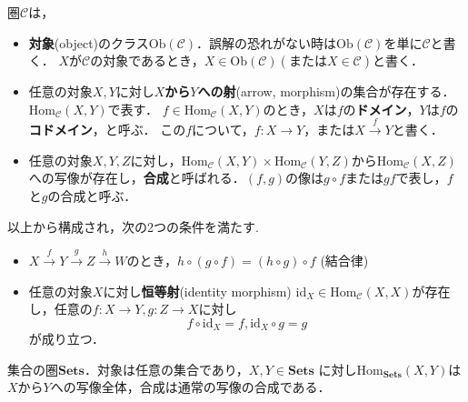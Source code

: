 
\begin{defi}
圏$\mathcal{C}$は，
\begin{itemize}

\item 
{\bf 対象}(object)のクラス$\mathrm{Ob}(\mathcal{C})$．誤解の恐れがない時は$\mathrm{Ob}(\mathcal{C})$を単に$\mathcal{C}$と書く．
$X$が$\mathcal{C}$の対象であるとき，$X \in \mathrm{Ob}(\mathcal{C}) (または X \in \mathcal{C})$と書く．

\item 
任意の対象$X,Y$に対し{\bf $X$から$Y$への射}(arrow, morphism)の集合が存在する．
$\mathrm{Hom}_\mathcal{C}(X,Y)$で表す．
$f \in \mathrm{Hom}_\mathcal{C}(X,Y)$のとき，$X$は$f$の{\bf ドメイン}，$Y$は$f$の{\bf コドメイン}，と呼ぶ．
この$f$について，$f:X \to Y$，または$X \xrightarrow{f} Y$と書く．

\item 
任意の対象$X,Y,Z$に対し，$\mathrm{Hom}_\mathcal{C}(X,Y) \times \mathrm{Hom}_\mathcal{C}(Y,Z)$から$\mathrm{Hom}_\mathcal{C}(X,Z)$への写像が存在し，{\bf 合成}と呼ばれる．$(f,g)$の像は$g \circ f$または$gf$で表し，$f$と$g$の合成と呼ぶ．

\end{itemize}
以上から構成され，次の2つの条件を満たす.
\begin{itemize}
\item
$X \xrightarrow{f} Y \xrightarrow{g} Z \xrightarrow{h} W$のとき，$h \circ (g \circ f) = (h \circ g) \circ f$ (結合律)
\item
任意の対象$X$に対し{\bf 恒等射}(identity morphism) $\mathrm{id}_X \in \mathrm{Hom}_\mathcal{C}(X,X)$が存在し，任意の$f:X \to Y , g:Z \to X$に対し
\[
	f \circ \mathrm{id}_X = f, 	\mathrm{id}_X \circ g = g
\]
が成り立つ．
\end{itemize}
\end{defi} \proofend


\begin{ex}
集合の圏$\mathbf{Sets}$．対象は任意の集合であり，$X,Y \in \mathbf{Sets}$ に対し$\mathrm{Hom}_\mathbf{Sets}(X,Y)$は$X$から$Y$への写像全体，合成は通常の写像の合成である．
\end{ex} \proofend

